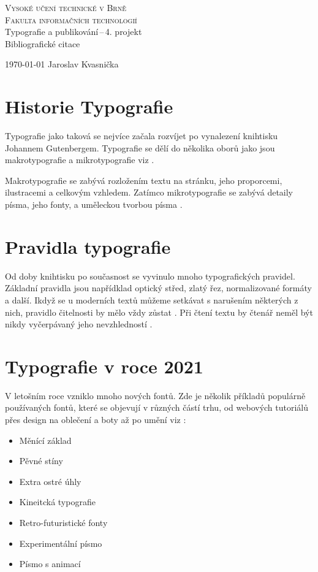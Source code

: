 \documentclass[a4paper,11pt]{article}
\begin{document}
\begin{titlepage}
\begin{center}
\Huge\textsc{Vysoké učení technické v Brně} \\
\huge\textsc{Fakulta informačních technologií}
\\
\LARGE Typografie a publikování\,--\,4. projekt \\ \Huge{Bibliografické citace} 
\end{center}
{\Large \today \hfill
Jaroslav Kvasnička}
\end{titlepage}



\section{Historie Typografie}
Typografie jako taková se nejvíce začala rozvíjet po vynalezení knihtisku Johannem Gutenbergem. Typografie se dělí do několika oborů jako jsou makrotypografie a mikrotypografie viz \cite{HaleyAllan}.
\par
Makrotypografie se zabývá rozložením textu na stránku, jeho proporcemi, ilustracemi a celkovým vzhledem.
Zatímco mikrotypografie se zabývá detaily písma, jeho fonty, a uměleckou tvorbou písma \cite{MartinaVichova}.


\section{Pravidla typografie}
Od doby knihtisku po současnost se vyvinulo mnoho typografických pravidel. Základní pravidla jsou napřídklad optický střed, zlatý řez, normalizované formáty a další. Ikdyž se u moderních textů můžeme setkávat s narušením některých z nich, pravidlo čitelnosti by mělo vždy zůstat \cite{Vesely}. Při čtení textu by čtenář neměl být nikdy vyčerpávaný jeho nevzhledností \cite{JanRajlich}.


\section{Typografie v roce 2021}
V letošním roce vzniklo mnoho nových fontů. Zde je několik příkladů populárně používaných fontů, které se objevují v různých částí trhu, od webových tutoriálů přes design na oblečení a boty až po umění viz \cite{TheLogoCreative2021}:
\begin{itemize}
\item{Měnící základ}
\item{Pěvné stíny}
\item{Extra ostré úhly}
\item{Kineitcká typografie}
\item{Retro-futuristické fonty}
\item{Experimentální písmo}
\item{Písmo s animací}
\end{itemize}
\end{document}

